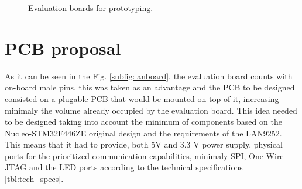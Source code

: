 
\begin{figure}[ht]
    \centering
    \hfill
    \caption{Evaluation boards for prototyping.}
    \label{fig:evalboards}
\end{figure}

\section{PCB proposal}
As it can be seen in the Fig. \ref{subfig:lanboard}, the evaluation board counts with on-board male pins, this was taken as an advantage and the PCB to be designed
consisted on a plugable PCB that would be mounted on top of it, increasing minimaly the volume already occupied by the evaluation board. This idea needed to be 
designed taking into account the minimum of components based on the Nucleo-STM32F446ZE original design and the requirements of the LAN9252. This means that 
it had to provide, both 5V and 3.3 V power supply, physical ports for the prioritized communication capabilities, minimaly SPI, One-Wire JTAG and the LED ports 
according to the technical specifications \ref{tbl:tech_specs}.

